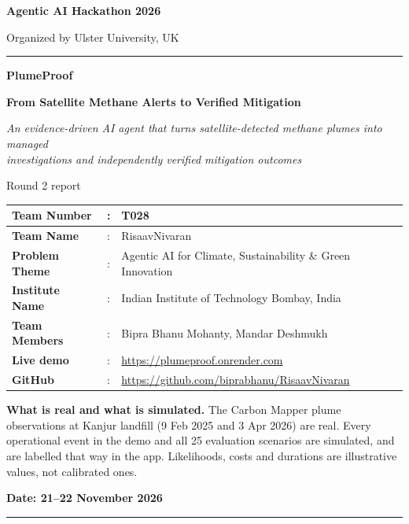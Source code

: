 \begin{titlepage}
\centering
{\large\bfseries Agentic AI Hackathon 2026\par}
\vspace{2pt}
{\normalsize Organized by Ulster University, UK\par}
\vspace{10pt}
{\color{pteal}\rule{\textwidth}{1.2pt}}
\vspace{18pt}

{\LARGE\bfseries\color{pteal} PlumeProof\par}
\vspace{6pt}
{\Large\bfseries From Satellite Methane Alerts to Verified Mitigation\par}
\vspace{10pt}
{\itshape\color{pslate} An evidence-driven AI agent that turns satellite-detected methane plumes into managed\\ investigations and independently verified mitigation outcomes\par}
\vspace{6pt}
{\normalsize Round 2 report\par}
\vspace{22pt}

\renewcommand{\arraystretch}{1.55}
\begin{tabular}{|p{}|p{}|p{}|}
\hline
\textbf{Team Number} & : & T028 \\ \hline
\textbf{Team Name} & : & RisaavNivaran \\ \hline
\textbf{Problem Theme} & : & Agentic AI for Climate, Sustainability \& Green Innovation \\ \hline
\textbf{Institute Name} & : & Indian Institute of Technology Bombay, India \\ \hline
\textbf{Team Members} & : & Bipra Bhanu Mohanty, Mandar Deshmukh \\ \hline
\textbf{Live demo} & : & \href{https://plumeproof.onrender.com}{https://plumeproof.onrender.com} \\ \hline
\textbf{GitHub} & : & \href{https://github.com/biprabhanu/RisaavNivaran}{https://github.com/biprabhanu/RisaavNivaran} \\ \hline
\end{tabular}

\vspace{26pt}
\begin{minipage}{0.86\textwidth}
\centering\color{pslate}\small
\textbf{\color{pteal}What is real and what is simulated.} The Carbon Mapper plume observations at Kanjur landfill (9 Feb 2025 and 3 Apr 2026) are real. Every operational event in the demo and all 25 evaluation scenarios are simulated, and are labelled that way in the app. Likelihoods, costs and durations are illustrative values, not calibrated ones.
\end{minipage}

\vfill
{\bfseries Date: 21--22 November 2026\par}
\vspace{6pt}
{\color{pteal}\rule{\textwidth}{1.2pt}}
\end{titlepage}
\setcounter{page}{2}
